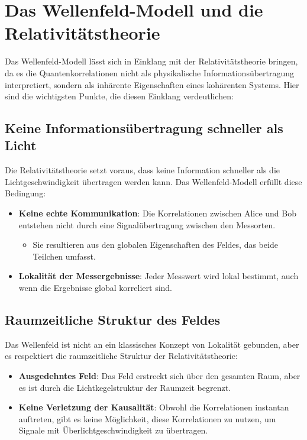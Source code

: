 \documentclass[12pt,a4paper]{article}
\begin{document}
	\section{Das Wellenfeld-Modell und die Relativitätstheorie}
	
	Das Wellenfeld-Modell lässt sich in Einklang mit der Relativitätstheorie bringen, da es die Quantenkorrelationen nicht als physikalische Informationsübertragung interpretiert, sondern als inhärente Eigenschaften eines kohärenten Systems. Hier sind die wichtigsten Punkte, die diesen Einklang verdeutlichen:
	
	\subsection{Keine Informationsübertragung schneller als Licht}
	
	Die Relativitätstheorie setzt voraus, dass keine Information schneller als die Lichtgeschwindigkeit übertragen werden kann. Das Wellenfeld-Modell erfüllt diese Bedingung:
	\begin{itemize}
		\item \textbf{Keine echte Kommunikation}: Die Korrelationen zwischen Alice und Bob entstehen nicht durch eine Signalübertragung zwischen den Messorten.
		\begin{itemize}
			\item Sie resultieren aus den globalen Eigenschaften des Feldes, das beide Teilchen umfasst.
		\end{itemize}
		\item \textbf{Lokalität der Messergebnisse}: Jeder Messwert wird lokal bestimmt, auch wenn die Ergebnisse global korreliert sind.
	\end{itemize}
	
	\subsection{Raumzeitliche Struktur des Feldes}
	
	Das Wellenfeld ist nicht an ein klassisches Konzept von Lokalität gebunden, aber es respektiert die raumzeitliche Struktur der Relativitätstheorie:
	\begin{itemize}
		\item \textbf{Ausgedehntes Feld}: Das Feld erstreckt sich über den gesamten Raum, aber es ist durch die Lichtkegelstruktur der Raumzeit begrenzt.
		\item \textbf{Keine Verletzung der Kausalität}: Obwohl die Korrelationen instantan auftreten, gibt es keine Möglichkeit, diese Korrelationen zu nutzen, um Signale mit Überlichtgeschwindigkeit zu übertragen.
	\end{itemize}
	
\end{document}
